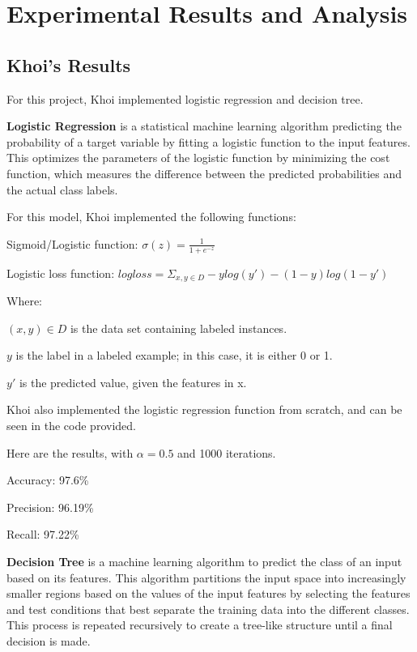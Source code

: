 \section{Experimental Results and Analysis}

\subsection{Khoi's Results}

For this project, Khoi implemented logistic regression and decision tree.

\textbf{Logistic Regression} is a statistical machine learning algorithm predicting the probability of a target variable by fitting a logistic function to the input features. This optimizes the parameters of the logistic function by minimizing the cost function, which measures the difference between the predicted probabilities and the actual class labels.

For this model, Khoi implemented the following functions:

Sigmoid/Logistic function: $\sigma(z) = \frac{1}{1 + e^{-z}}$

Logistic loss function: $log loss = \Sigma_{x, y \in D} -ylog(y') - (1 - y)log(1 - y')$

Where:

$(x, y) \in D$ is the data set containing labeled instances.

$y$ is the label in a labeled example; in this case, it is either 0 or 1.

$y'$ is the predicted value, given the features in x.

Khoi also implemented the logistic regression function from scratch, and can be seen in the code provided.

Here are the results, with $\alpha = 0.5$ and 1000 iterations.

Accuracy: 97.6\%

Precision: 96.19\%

Recall: 97.22\%

\textbf{Decision Tree} is a machine learning algorithm to predict the class of an input based on its features. This algorithm partitions the input space into increasingly smaller regions based on the values of the input features by selecting the features and test conditions that best separate the training data into the different classes. This process is repeated recursively to create a tree-like structure until a final decision is made.

